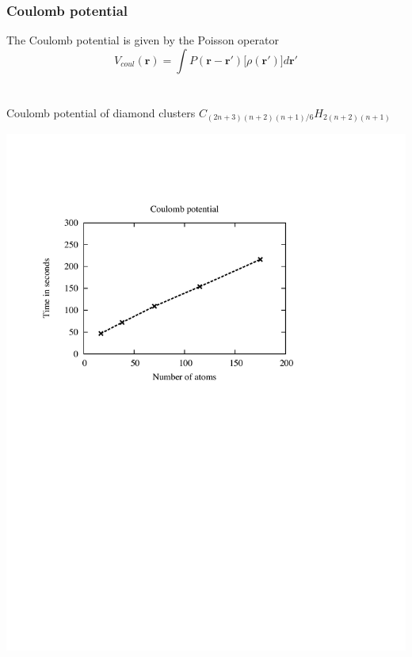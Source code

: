 \documentclass[mathserif]{beamer}
\begin{document}
\begin{frame}
    \frametitle{Coulomb potential}
    The Coulomb potential is given by the Poisson operator
    \begin{equation}
	\nonumber
	V_{coul}(\boldsymbol{r}) = 
	    \int P(\boldsymbol{r} - \boldsymbol{r}') \Big[ \rho(\boldsymbol{r}')\Big] 
	    d\boldsymbol{r}'
    \end{equation}
    \ \\
    \ \\
    \pause
    Coulomb potential of diamond clusters $C_{(2n+3)(n+2)(n+1)/6}H_{2(n+2)(n+1)}$
    \begin{center}
    \includegraphics[bb = 50 400 500 690, clip, scale=0.5]{figures/coulombScaling.pdf}
    \end{center}
\end{frame}
\end{document}
